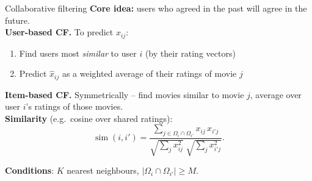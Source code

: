 \documentclass[aspectratio=169,t]{beamer}
\begin{document}
\begin{frame}{Collaborative filtering}
  \textbf{Core idea:} users who agreed in the past will agree in the future.\\[0.25cm]

  \textbf{User-based CF.} To predict $x_{ij}$:
  \begin{enumerate}
    \item Find users most \emph{similar} to user $i$ (by their rating vectors)
    \item Predict $\hat x_{ij}$ as a weighted average of their ratings of movie $j$
  \end{enumerate}

  \textbf{Item-based CF.} Symmetrically -- find movies similar to movie $j$, average over user $i$'s ratings of those movies.\\[0.2cm]

  \textbf{Similarity} (e.g.\ cosine over shared ratings):
  $$\operatorname{sim}(i,i') = \frac{\displaystyle\sum_{j \in \Omega_i \cap \Omega_{i'}} x_{ij}\,x_{i'j}}
      {\sqrt{\displaystyle\sum_j x_{ij}^2}\;\sqrt{\displaystyle\sum_j x_{i'j}^2}}.$$

  \textbf{Conditions}: $K$ nearest neighbours, $|\Omega_i \cap \Omega_{i'}| \geq M$. 
\end{frame}
\end{document}
